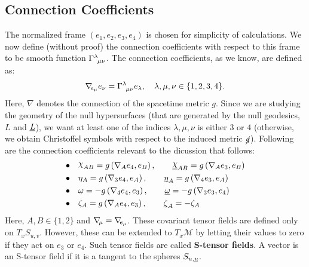 \documentclass[12pt, a4paper]{report}
\theoremstyle{bfnote}
\newcommand{\underit}[1]{\textit{\underbar{#1}}}
\newcommand{\chits}{\raisebox{0.5ex}{$\chi$}} %
\begin{document}
\subsection{Connection Coefficients}
The normalized frame $\left(e_1, e_2, e_3, e_4\right)$ is chosen for simplicity
of calculations. We now define (without proof) the connection coefficients with
respect to this frame to be smooth function
$\Gamma^\lambda_{\hspace{0.4em}\mu\nu}$. The connection coefficients, as we
know, are defined as:
\begin{equation*}
    \nabla_{\hspace{-0.2em}e_\mu}e_\nu = \Gamma^\lambda_{\hspace{0.4em}\mu\nu} e_\lambda, \quad \lambda, \mu, \nu \in \{1, 2, 3, 4\}.
\end{equation*}
Here, $\nabla$ denotes the connection of the spacetime metric $g$. Since we are
studying the geometry of the null hypersurfaces (that are generated by the null
geodesics, $L$ and $\underit{L}$), we want at least one of the indices $\lambda,
\mu, \nu$ is either $3$ or $4$ (otherwise, we obtain Christoffel symbols with
respect to the induced metric $\cancel{g}$). Following are the connection
coefficients relevant to the dicussion that follows:
\begin{align}
    \bullet \quad& \chits_{AB} = g\left(\nabla_A e_4, e_B\right), \quad\quad \underit{\chits}_{AB} = g\left(\nabla_A e_3, e_B\right)\label{eq:connectioncoeff1} \\
    \bullet \quad& \eta_A = g\left(\nabla_3 e_4, e_A\right), \quad\quad \underit{$\eta$}_A = g\left(\nabla_4 e_3, e_A\right) \label{eq:connectioncoeff2} \\
    \bullet \quad& \omega = -g\left(\nabla_4 e_4, e_3\right), \quad\quad \underit{$\omega$} = -g\left(\nabla_3 e_3, e_4\right) \label{eq:connectioncoeff3} \\
    \bullet \quad& \zeta_A = g\left(\nabla_A e_4, e_3\right), \quad\quad \underit{$\zeta$}_A = -\zeta_A \label{eq:connectioncoeff4}
\end{align}
Here, $A, B \in \{1, 2\}$ and $\nabla_{\hspace{-0.2em}\mu} =
\nabla_{\hspace{-0.2em}e_\mu}$. These covariant tensor fields are defined only
on $T_x S_{u,v}$. However, these can be extended to $T_x\mathcal{M}$ by letting
their values to zero if they act on $e_3$ or $e_4$. Such tensor fields are
called \textbf{S-tensor fields}. A vector is an S-tensor field if it is a
tangent to the spheres $S_{u,\underit{u}}$.\\
\end{document}
